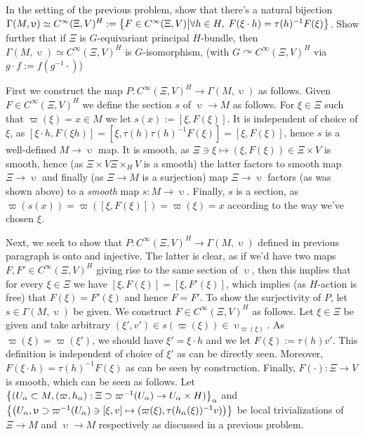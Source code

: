 \documentclass[8pt]{article} %
\newcommand{\myprobshort}[2]{\begin{myprob}[#1]#2\end{myprob}}
\begin{document}
\myprobshort{April 28, Prop. 4.2.1}{In the setting of the previous problem, show that there's a natural bijection
	$\Gamma(M,\upupsilon)\simeq C^\infty(\Xi,V)^H:=\left\{ F\in C^\infty(\Xi,V) \big| \forall h\in H,\;F(\xi\cdot h)=\tau(h)^{ -1 }
	F(\xi)\right\}$. Show further that if $\Xi$ is $G$-equivariant principal $H$-bundle, then 
	$\Gamma(M,\upupsilon)\simeq C^\infty(\Xi,V)^H$ is $G$-isomorphism, (with $G\curvearrowright C^\infty(\Xi,V)^H$
	via $g\cdot f:=f(g^{ -1 }\cdot)$)}
	First we construct the map $P:C^\infty(\Xi,V)^H\to\Gamma(M,\upupsilon)$ as follows.
	Given $F\in C^\infty(\Xi,V)^H$ we define the section $s$ of $\upupsilon\to M$ as follows. For $\xi\in\Xi$
	such that $\varpi(\xi)=x\in M$ we let $s(x):=[\xi,F(\xi)]$. It is independent of choice of $\xi$, as
	$[\xi\cdot h,F(\xi h)]=[\xi,\tau(h)\tau(h)^{ -1 }F(\xi)]=[\xi,F(\xi)]$, hence $s$ is a well-defined $M\to\upupsilon$
	map. It is smooth, as $\Xi\ni\xi\mapsto(\xi,F(\xi))\in\Xi\times V$ is smooth, hence (as $\Xi\times V\Xi\times_HV$ is
	a smooth) the latter factors to smooth map $\Xi\to\upupsilon$ and finally (as $\Xi\to M$ is a surjection) map
	$\Xi\to\upupsilon$ factors (as was shown above) to a {\it smooth} map $s:M\to\upupsilon$. Finally, $s$ is a section,
	as $\varpi(s(x))=\varpi([\xi,F(\xi)])=\varpi(\xi)=x$ according to the way we've chosen $\xi$.\par
	Next, we seek to show that $P:C^\infty(\Xi,V)^H\to\Gamma(M,\upupsilon)$ defined in previous paragraph is onto and injective.
	The latter is clear, as if we'd have two maps $F,F'\in C^\infty(\Xi,V)^H$ giving rise to the same section of $\upupsilon$,
	then this implies that for every $\xi\in\Xi$ we have $[\xi,F(\xi)]=[\xi,F'(\xi)]$, which implies (as $H$-action is
	free) that $F(\xi)=F'(\xi)$ and hence $F=F'$. To show the surjectivity of $P$, let $s\in\Gamma(M,\upupsilon)$ be given.
	We construct $F\in C^\infty(\Xi,V)^H$ as follows. Let $\xi\in \Xi$ be given and take arbitrary
	$(\xi',v')\in s(\varpi(\xi))\in\upupsilon_{ \varpi
	(\xi) }$. As $\varpi(\xi)=\varpi(\xi')$, we should have $\xi'=\xi\cdot h$ and we let $F(\xi):=\tau(h)v'$.
	This definition is independent of choice of $\xi'$ as can be directly seen. Moreover, $F(\xi\cdot h)=\tau(h)^{ -1 }F(\xi)$
	as can be seen by construction. Finally, $F(\cdot):\Xi\to V$ is smooth, which can be seen as follows. Let
	$\left\{(U_\alpha\subset M,(\varpi,h_\alpha):\Xi\supset\varpi^{ -1 }(U_\alpha)\to U_\alpha\times H)\right\}_\alpha$
	and $\left\{ \left( U_\alpha,\upupsilon\supset\varpi^{ -1 }(U_\alpha)\ni[\xi,v]\mapsto(\varpi(\xi),\tau(h_\alpha(\xi))^
	{ -1 }v) \right) \right\}$ be local trivializations of $\Xi\to M$ and $\upupsilon\to M$ respectively as discussed in a previous problem.
\end{document}
